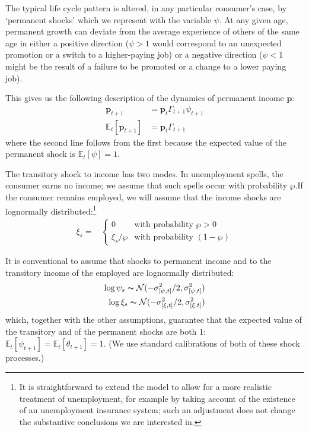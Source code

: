 \documentclass{article}
\newcommand{\pLvl}{\mathbf{p}}
\newcommand{\Ex}{\mathbb{E}}
\newcommand{\permGroFac}{\Gamma}
\newcommand{\permShk}{\psi}
\newcommand{\pZero}{\wp}
\newcommand{\tranShkEmp}{\xi}
\newcommand{\tranShk}{\theta}
\begin{document}
The typical life cycle pattern is altered, in any particular consumer's case, by `permanent shocks' which we represent with the variable $\permShk$. At any given age, permanent growth can deviate from the average experience of others of the same age in either a positive direction ($\psi>1$ would correspond to an unexpected promotion or a switch to a higher-paying job) or a negative direction ($\psi < 1$ might be the result of a failure to be promoted or a change to a lower paying job).

This gives us the following description of the dynamics of permanent income $\pLvl$:
\begin{align}
    \pLvl_{t+1} & = \pLvl_{t} \permGroFac_{t+1} \permShk_{t+1}
    \\ \Ex_{t}[\pLvl_{t+1}] & = \pLvl_{t} \permGroFac_{t+1}
\end{align}
where the second line follows from the first because the expected value of the permanent shock is $\Ex_{t}[\permShk]=1$.

The transitory shock to income has two modes. In unemployment spells, the consumer earns no income; we assume that such spells occur with probability $\pZero$.If the consumer remains employed, we will assume that the income shocks are lognormally distributed:\footnote{It is straightforward to extend the model to allow for a more realistic treatment of unemployment, for example by taking account of the existence of an unemployment insurance system; such an adjustment does not change the substantive conclusions we are interested in.}
\begin{align}
    \tranShkEmp_{s} = &
    \begin{cases}
        0\phantom{/\pZero} & \text{with probability $\pZero>0$}
        \\ \xi_{s}/\pZero & \text{with probability $(1-\pZero)$}
    \end{cases}
\end{align}

It is conventional to assume that shocks to permanent income and to the transitory income of the employed are lognormally distributed:
\begin{align}
    \log \permShk_{s} \thicksim \mathcal{N}(-\sigma_{[\permShk, t]}^{2}/2,\sigma_{[\permShk, t]}^{2})
    \\ \log \xi_{s}\thicksim \mathcal{N}(-\sigma_{[\xi, t]}^{2}/2,\sigma_{[\xi, t]}^{2})
\end{align}
which, together with the other assumptions, guarantee that the expected value of the transitory and of the permanent shocks are both 1: $\Ex_{t}[\permShk_{t+1}]=\Ex_{t}[\tranShk_{t+1}]=1$. (We use standard calibrations of both of these shock processes.)
\end{document}
